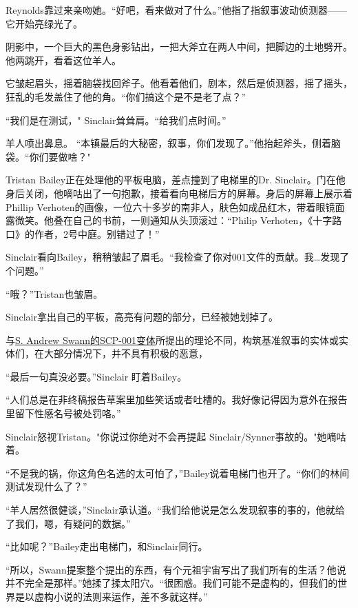 Reynolds靠过来亲吻她。“好吧，看来做对了什么。”他指了指叙事波动侦测器——它开始亮绿光了。

阴影中，一个巨大的黑色身影钻出，一把大斧立在两人中间，把脚边的土地劈开。他两跳开，看着这位羊人。

它皱起眉头，摇着脑袋找回斧子。他看着他们，剧本，然后是侦测器，摇了摇头，狂乱的毛发盖住了他的角。“你们搞这个是不是老了点？”

“我们是在测试，" Sinclair耸耸肩。“给我们点时间。”

羊人喷出鼻息。 “本镇最后的大秘密，叙事，你们发现了。”他抬起斧头，侧着脑袋。“你们要做啥？"

\hr

Tristan Bailey正在处理他的平板电脑，差点撞到了电梯里的Dr. Sinclair。门在他身后关闭，他嘀咕出了一句抱歉，接着看向电梯后方的屏幕。身后的屏幕上展示着Phillip Verhoten的画像，一位六十多岁的南非人，肤色如成品红木，带着眼镜面露微笑。他叠在自己的书前，一则通知从头顶滚过：“Philip Verhoten，《十字路口》的作者，2号中庭。别错过了！”

Sinclair看向Bailey，稍稍皱起了眉毛。“我检查了你对001文件的贡献。我…发现了个问题。”

“哦？”Tristan也皱眉。

Sinclair拿出自己的平板，高亮有问题的部分，已经被她划掉了。

\begin{scpbox}

与\hyperref[chap:SCP-001.the.database]{S. Andrew Swann的SCP-001变体}所提出的理论不同，构筑基准叙事的实体或实体们，在大部分情况下，并不具有积极的恶意，

\end{scpbox}

“最后一句真没必要。”Sinclair 盯着Bailey。

“人们总是在非终稿报告草案里加些笑话或者吐槽的。我好像记得因为意外在报告里留下性感名号被处罚咯。”

Sinclair怒视Tristan。"你说过你绝对不会再提起 Sinclair\slash Synner事故的。"她嘀咕着。

“不是我的锅，你这角色名选的太可怕了，”Bailey说着电梯门也开了。“你们的林间测试发现什么了？”

“羊人居然很健谈，”Sinclair承认道。“我们给他说是怎么发现叙事的事的，他就给了我们，嗯，有疑问的数据。”

“比如呢？”Bailey走出电梯门，和Sinclair同行。

“所以，Swann提案整个提出的东西，有个元祖宇宙写出了我们所有的生活？他说并不完全是那样。”她揉了揉太阳穴。“很困惑。我们可能不是虚构的，但我们的世界是以虚构小说的法则来运作，差不多就这样。”

